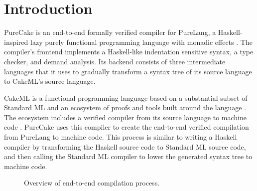 \documentclass[sigconf]{acmart}
\begin{document}


\begin{teaserfigure}
  \centering
  
  \caption{GC inlining of a list of evaluated thunks.}
  \label{fig:teaser}
\end{teaserfigure}

\maketitle

\section{Introduction}
\label{sec:intro}

PureCake is an end-to-end formally verified compiler for PureLang, a
Haskell-inspired lazy purely functional programming language with monadic
effects \cite{PureCake}. The compiler's frontend implements a Haskell-like
indentation sensitive syntax, a type checker, and demand analysis. Its backend
consists of three intermediate languages that it uses to gradually transform a
syntax tree of its source language to CakeML's source language.

CakeML is a functional programming language based on a substantial subset of
Standard ML and an ecosystem of proofs and tools built around the language
\cite{CakeML}. The ecosystem includes a verified compiler from its source
language to machine code \cite{CakeMLCompiler}. PureCake uses this compiler to
create the end-to-end verified compilation from PureLang to machine code. This
process is similar to writing a Haskell compiler by transforming the Haskell
source code to Standard ML source code, and then calling the Standard ML
compiler to lower the generated syntax tree to machine code.
\begin{figure}[h]
  \centering
  
  \caption{Overview of end-to-end compilation process.}
  \label{fig:comp-process}
\end{figure}
\end{document}
